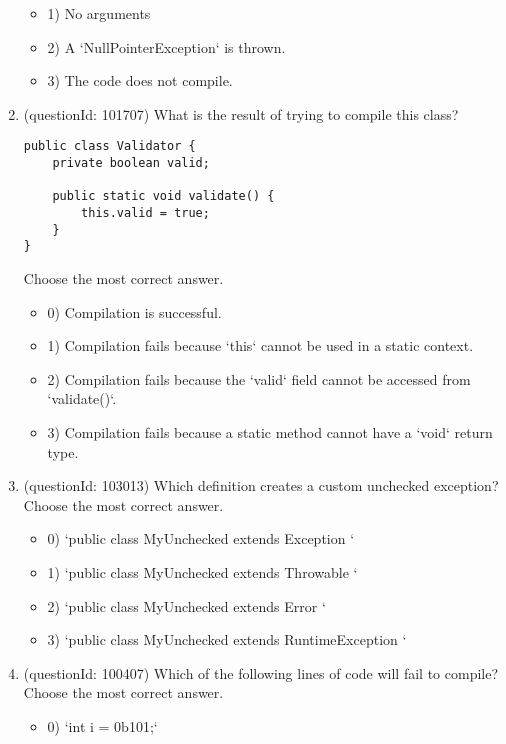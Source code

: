 \documentclass[12pt]{article}
\begin{document}
\begin{enumerate}[label=(\arabic*)]
\begin{itemize}
\item 1) No arguments

\item 2) A `NullPointerException` is thrown.

\item 3) The code does not compile.

\end{itemize}
\item (questionId: 101707) What is the result of trying to compile this class?\n\begin{verbatim}
public class Validator {
    private boolean valid;

    public static void validate() {
        this.valid = true;
    }
}
\end{verbatim}
Choose the most correct answer. 
\begin{itemize}
\item 0) Compilation is successful.

\item 1) Compilation fails because `this` cannot be used in a static context.

\item 2) Compilation fails because the `valid` field cannot be accessed from `validate()`.

\item 3) Compilation fails because a static method cannot have a `void` return type.

\end{itemize}
\item (questionId: 103013) Which definition creates a custom unchecked exception?
Choose the most correct answer. 
\begin{itemize}
\item 0) `public class MyUnchecked extends Exception { }`

\item 1) `public class MyUnchecked extends Throwable { }`

\item 2) `public class MyUnchecked extends Error { }`

\item 3) `public class MyUnchecked extends RuntimeException { }`

\end{itemize}
\item (questionId: 100407) Which of the following lines of code will fail to compile?
Choose the most correct answer. 
\begin{itemize}
\item 0) `int i = 0b101;`


\end{itemize}
\end{enumerate}
\end{document}
